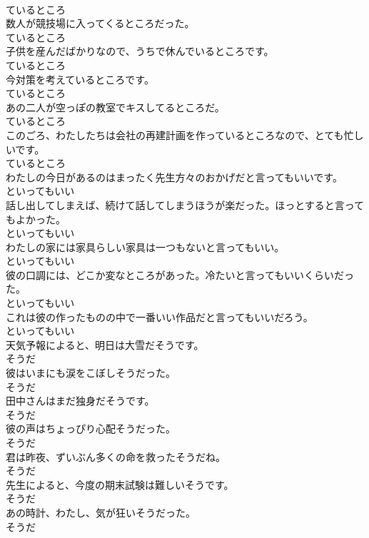 \documentclass[8pt]{extreport}
\begin{document}
\begin{CJK}{UTF8}{min}
\\	ているところ	
\\	数人が競技場に入ってくるところだった。	
\\	ているところ	
\\	子供を産んだばかりなので、うちで休んでいるところです。	
\\	ているところ	
\\	今対策を考えているところです。	
\\	ているところ	
\\	あの二人が空っぽの教室でキスしてるところだ。	
\\	ているところ	
\\	このごろ、わたしたちは会社の再建計画を作っているところなので、とても忙しいです。	
\\	ているところ	
\\	わたしの今日があるのはまったく先生方々のおかげだと言ってもいいです。	
\\	といってもいい	
\\	話し出してしまえば、続けて話してしまうほうが楽だった。ほっとすると言ってもよかった。	
\\	といってもいい	
\\	わたしの家には家具らしい家具は一つもないと言ってもいい。	
\\	といってもいい	
\\	彼の口調には、どこか変なところがあった。冷たいと言ってもいいくらいだった。	
\\	といってもいい	
\\	これは彼の作ったものの中で一番いい作品だと言ってもいいだろう。	
\\	といってもいい	
\\	天気予報によると、明日は大雪だそうです。	
\\	そうだ	
\\	彼はいまにも涙をこぼしそうだった。	
\\	そうだ	
\\	田中さんはまだ独身だそうです。	
\\	そうだ	
\\	彼の声はちょっぴり心配そうだった。	
\\	そうだ	
\\	君は昨夜、ずいぶん多くの命を救ったそうだね。	
\\	そうだ	
\\	先生によると、今度の期末試験は難しいそうです。	
\\	そうだ	
\\	あの時計、わたし、気が狂いそうだった。	
\\	そうだ	

\end{CJK}
\end{document}
